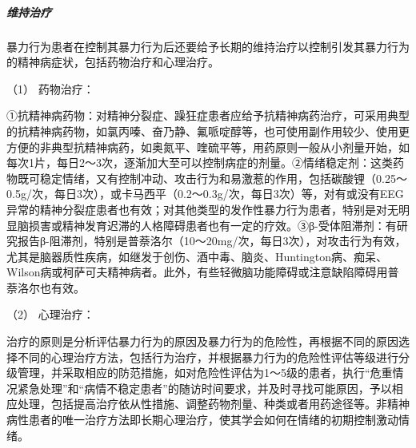 \subparagraph{维持治疗}

暴力行为患者在控制其暴力行为后还要给予长期的维持治疗以控制引发其暴力行为的精神病症状，包括药物治疗和心理治疗。

\hypertarget{text00054.htmlux5cux23CHP1-18-12-3-6-1}{}
（1） 药物治疗：

①抗精神病药物：对精神分裂症、躁狂症患者应给予抗精神病药治疗，可采用典型的抗精神病药物，如氯丙嗪、奋乃静、氟哌啶醇等，也可使用副作用较少、使用更方便的非典型抗精神病药，如奥氮平、喹硫平等，用药原则一般从小剂量开始，如每次1片，每日2～3次，逐渐加大至可以控制病症的剂量。②情绪稳定剂：这类药物既可稳定情绪，又有控制冲动、攻击行为和易激惹的作用，包括碳酸锂（0.25～0.5g/次，每日3次），或卡马西平（0.2～0.3g/次，每日3次）等，对有或没有EEG异常的精神分裂症患者也有效；对其他类型的发作性暴力行为患者，特别是对无明显脑损害或精神发育迟滞的人格障碍患者也有一定的疗效。③β-受体阻滞剂：有研究报告β-阻滞剂，特别是普萘洛尔（10～20mg/次，每日3次），对攻击行为有效，尤其是脑器质性疾病，如继发于创伤、酒中毒、脑炎、Huntington病、痴呆、Wilson病或柯萨可夫精神病者。此外，有些轻微脑功能障碍或注意缺陷障碍用普萘洛尔也有效。

\hypertarget{text00054.htmlux5cux23CHP1-18-12-3-6-2}{}
（2） 心理治疗：

治疗的原则是分析评估暴力行为的原因及暴力行为的危险性，再根据不同的原因选择不同的心理治疗方法，包括行为治疗，并根据暴力行为的危险性评估等级进行分级管理，并采取相应的防范措施，如对危险性评估为1～5级的患者，执行“危重情况紧急处理”和“病情不稳定患者”的随访时间要求，并及时寻找可能原因，予以相应处理，包括提高治疗依从性措施、调整药物剂量、种类或者用药途径等。非精神病性患者的唯一治疗方法即长期心理治疗，使其学会如何在情绪的初期控制激动情绪。

\protect\hypertarget{text00055.html}{}{}

